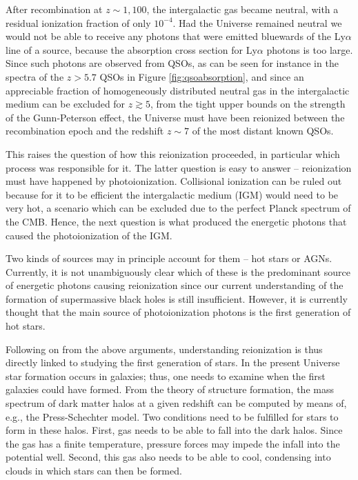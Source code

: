 \documentclass[a4paper,11pt]{article}
\begin{document}
After recombination at $z\sim1,100$, the intergalactic gas became neutral, with a residual ionization fraction of only $10^{-4}$. Had the Universe remained neutral we would not be able to receive any photons that were emitted bluewards of the Ly$\alpha$ line of a source, because the absorption cross section for Ly$\alpha$ photons is too large. Since such photons are observed from QSOs, as can be seen for instance in the spectra of the $z>5.7$ QSOs in Figure \ref{fig:qsoabsorption}, and since an appreciable fraction of homogeneously distributed neutral gas in the intergalactic medium can be excluded for $z\gtrsim5$, from the tight upper bounds on the strength of the Gunn-Peterson effect, the Universe must have been reionized between the recombination epoch and the redshift $z\sim7$ of the most distant known QSOs.

{\noindent}This raises the question of how this reionization proceeded, in particular which process was responsible for it. The latter question is easy to answer -- reionization must have happened by photoionization. Collisional ionization can be ruled out because for it to be efficient the intergalactic medium (IGM) would need to be very hot, a scenario which can be excluded due to the perfect Planck spectrum of the CMB. Hence, the next question is what produced the energetic photons that caused the photoionization of the IGM.

{\noindent}Two kinds of sources may in principle account for them -- hot stars or AGNs. Currently, it is not unambiguously clear which of these is the predominant source of energetic photons causing reionization since our current understanding of the formation of supermassive black holes is still insufficient. However, it is currently thought that the main source of photoionization photons is the first generation of hot stars.

{\noindent}Following on from the above arguments, understanding reionization is thus directly linked to studying the first generation of stars. In the present Universe star formation occurs in galaxies; thus, one needs to examine when the first galaxies could have formed. From the theory of structure formation, the mass spectrum of dark matter halos at a given redshift can be computed by means of, e.g., the Press-Schechter model. Two conditions need to be fulfilled for stars to form in these halos. First, gas needs to be able to fall into the dark halos. Since the gas has a finite temperature, pressure forces may impede the infall into the potential well. Second, this gas also needs to be able to cool, condensing into clouds in which stars can then be formed.
\end{document}
